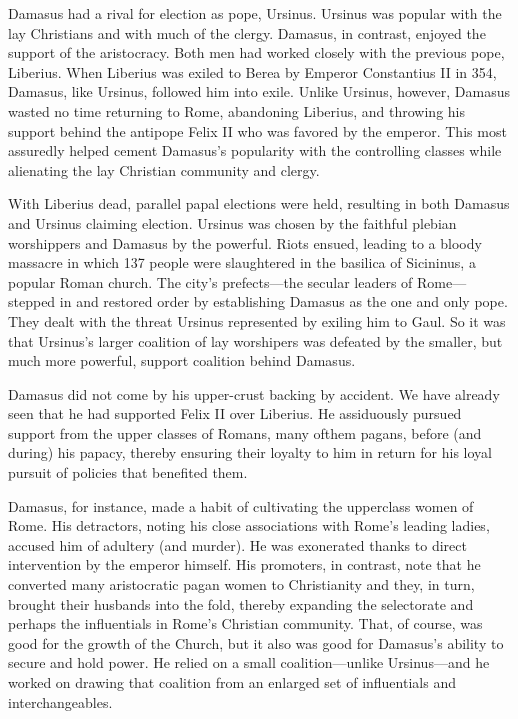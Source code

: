 \documentclass[10pt]{article}
\begin{document}
{\large Damasus had a rival for election as pope, Ursinus. Ursinus was popular
with the lay Christians and with much of the clergy. Damasus, in contrast,
enjoyed the support of the aristocracy. Both men had worked closely with the
previous pope, Liberius. When Liberius was exiled to Berea by Emperor Constantius
II in 354, Damasus, like Ursinus, followed him into exile. Unlike Ursinus,
however, Damasus wasted no time returning to Rome, abandoning Liberius, and
throwing his support behind the antipope Felix II who was favored by the emperor.
This most assuredly helped cement Damasus's popularity with the controlling
classes while alienating the lay Christian community and clergy.}

{\large With Liberius dead, parallel papal elections were held, resulting in
both Damasus and Ursinus claiming election. Ursinus was chosen by the faithful
plebian worshippers and Damasus by the powerful. Riots ensued, leading to a
bloody massacre in which 137 people were slaughtered in the basilica of
Sicininus, a popular Roman church. The city's prefects---the secular leaders of
Rome---stepped in and restored order by establishing Damasus as the one and only
pope. They dealt with the threat Ursinus represented by exiling him to Gaul. So
it was that Ursinus's larger coalition of lay worshipers was defeated by the
smaller, but much more powerful, support coalition behind Damasus.}

{\large Damasus did not come by his upper-crust backing by accident. We have
already seen that he had supported Felix II over Liberius. He assiduously pursued
support from the upper classes of Romans, many ofthem pagans, before (and during)
his papacy, thereby ensuring their loyalty to him in return for his loyal pursuit
of policies that benefited them.}

{\large Damasus, for instance, made a habit of cultivating the upperclass women
of Rome. His detractors, noting his close associations with Rome's leading
ladies, accused him of adultery (and murder). He was exonerated thanks to direct
intervention by the emperor himself. His promoters, in contrast, note that he
converted many aristocratic pagan women to Christianity and they, in turn,
brought their husbands into the fold, thereby expanding the selectorate and
perhaps the influentials in Rome's Christian community. That, of course, was good
for the growth of the Church, but it also was good for Damasus's ability to
secure and hold power. He relied on a small coalition---unlike Ursinus---and he
worked on drawing that coalition from an enlarged set of influentials and
interchangeables.}
\end{document}
